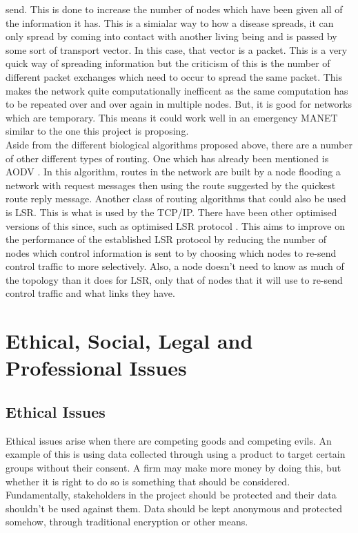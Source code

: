 \documentclass{report}
\begin{document}
send. This is done to increase the number of nodes which have been given all of the information it has. This is a simialar way to how a disease spreads, it can only spread 
by coming into contact with another living being and is passed by some sort of transport vector. In this case, that vector is a packet. This is a very quick way of spreading 
information but the criticism of this is the number of different packet exchanges which need to occur to spread the same packet. This makes the network quite computationally 
inefficent as the same computation has to be repeated over and over again in multiple nodes. But, it is good for networks which are temporary. This means it could work well 
in an emergency MANET similar to the one this project is proposing.  
\bigskip\\
Aside from the different biological algorithms proposed above, there are a number of other different types of routing. One which has already been mentioned is AODV \cite{phong2010enhancing}.
In this algorithm, routes in the network are built by a node flooding a network with request messages then using the route suggested by the quickest route reply message. Another 
class of routing algorithms that could also be used is LSR. This is what is used by the TCP/IP. There have been other optimised versions of this since, such as 
optimised LSR protocol \cite{OLSRP}. This aims to improve on the performance of the established LSR protocol by reducing the number of nodes which control information is sent to 
by choosing which nodes to re-send control traffic to more selectively. Also, a node doesn't need to know as much of the topology than it does for LSR, only that of nodes that 
it will use to re-send control traffic and what links they have.

\chapter*{Ethical, Social, Legal and Professional Issues}

\section*{Ethical Issues}

Ethical issues arise when there are competing goods and competing evils. An example of this 
is using data collected through using a product to target certain groups without their consent. 
A firm may make more money by doing this, but whether it is right to do so is something that 
should be considered. Fundamentally, stakeholders in the project should be protected and their 
data shouldn't be used against them. Data should be kept anonymous and protected somehow, through 
traditional encryption or other means. 
\end{document}
